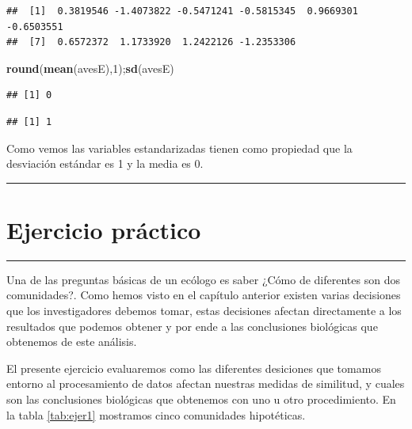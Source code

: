 \documentclass[]{book}
\newenvironment{Shaded}{\begin{snugshade}}{\end{snugshade}}
\newcommand{\KeywordTok}[1]{\textcolor[rgb]{0.13,0.29,0.53}{\textbf{{#1}}}}
\newcommand{\DecValTok}[1]{\textcolor[rgb]{0.00,0.00,0.81}{{#1}}}
\newcommand{\NormalTok}[1]{{#1}}
\begin{document}
\begin{verbatim}
##  [1]  0.3819546 -1.4073822 -0.5471241 -0.5815345  0.9669301 -0.6503551
##  [7]  0.6572372  1.1733920  1.2422126 -1.2353306
\end{verbatim}

\begin{Shaded}
\begin{Highlighting}[]
\KeywordTok{round}\NormalTok{(}\KeywordTok{mean}\NormalTok{(avesE),}\DecValTok{1}\NormalTok{);}\KeywordTok{sd}\NormalTok{(avesE) }
\end{Highlighting}
\end{Shaded}

\begin{verbatim}
## [1] 0
\end{verbatim}

\begin{verbatim}
## [1] 1
\end{verbatim}

Como vemos las variables estandarizadas tienen como propiedad que la
desviación estándar es 1 y la media es 0.

\begin{center}\rule{0.5\linewidth}{\linethickness}\end{center}

\chapter{Ejercicio práctico}\label{ejercicio-practico-1}

\begin{center}\rule{0.5\linewidth}{\linethickness}\end{center}

Una de las preguntas básicas de un ecólogo es saber ¿Cómo de diferentes
son dos comunidades?. Como hemos visto en el capítulo anterior existen
varias decisiones que los investigadores debemos tomar, estas decisiones
afectan directamente a los resultados que podemos obtener y por ende a
las conclusiones biológicas que obtenemos de este análisis.

El presente ejercicio evaluaremos como las diferentes desiciones que
tomamos entorno al procesamiento de datos afectan nuestras medidas de
similitud, y cuales son las conclusiones biológicas que obtenemos con
uno u otro procedimiento. En la tabla \ref{tab:ejer1} mostramos cinco
comunidades hipotéticas.
\end{document}
